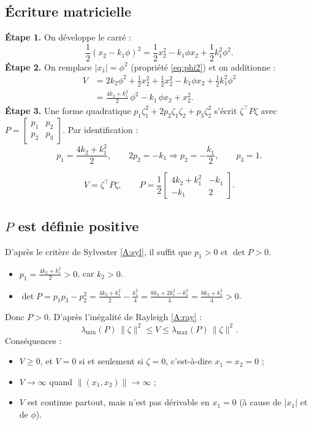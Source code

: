 \documentclass[11pt,a4paper]{article}
\numberwithin{equation}{section}
\theoremstyle{plain}
\theoremstyle{definition}
\theoremstyle{remark}
\begin{document}
\subsection{Écriture matricielle}
\textbf{Étape 1.} On développe le carré :
\begin{equation}
\frac12(x_2-k_1\phi)^2 = \frac12x_2^2 - k_1\phi x_2 + \frac12k_1^2\phi^2 .
\end{equation}
\textbf{Étape 2.} On remplace $|x_1|=\phi^2$ (propriété \eqref{eq:phi2}) et on additionne :
\begin{align}
V &= 2k_2\phi^2 + \frac12x_2^2 + \frac12x_2^2 - k_1\phi x_2 + \frac12k_1^2\phi^2\\
  &= \frac{4k_2+k_1^2}{2}\,\phi^2 - k_1\,\phi x_2 + x_2^2 .
\end{align}
\textbf{Étape 3.} Une forme quadratique $p_1\zeta_1^2 + 2p_2\zeta_1\zeta_2 + p_3\zeta_2^2$ s'écrit $\zeta^\top P\zeta$
avec $P=\begin{bmatrix}p_1&p_2\\p_2&p_3\end{bmatrix}$. Par identification :
\begin{equation}
p_1 = \frac{4k_2+k_1^2}{2},\qquad 2p_2 = -k_1\Rightarrow p_2=-\frac{k_1}{2},\qquad p_3 = 1 .
\end{equation}
\begin{resultat}
\begin{equation}
V = \zeta^\top P\zeta,\qquad P = \frac12\begin{bmatrix}4k_2+k_1^2 & -k_1\\ -k_1 & 2\end{bmatrix}.
\end{equation}
\end{resultat}

\subsection{$P$ est définie positive}
D'après le critère de Sylvester \eqref{A:syl}, il suffit que $p_1>0$ et $\det P>0$.
\begin{itemize}
  \item $p_1 = \frac{4k_2+k_1^2}{2}>0$, car $k_2>0$.
  \item $\det P = p_1p_3-p_2^2 = \frac{4k_2+k_1^2}{2} - \frac{k_1^2}{4} = \frac{8k_2+2k_1^2-k_1^2}{4} = \frac{8k_2+k_1^2}{4}>0$.
\end{itemize}
Donc $P>0$. D'après l'inégalité de Rayleigh \eqref{A:ray} :
\begin{equation}\label{eq:rayleighP}
\lambda_{\min}(P)\,\|\zeta\|^2\le V\le\lambda_{\max}(P)\,\|\zeta\|^2 .
\end{equation}
Conséquences :
\begin{itemize}
  \item $V\ge0$, et $V=0$ si et seulement si $\zeta=0$, c'est-à-dire $x_1=x_2=0$ ;
  \item $V\to\infty$ quand $\|(x_1,x_2)\|\to\infty$ ;
  \item $V$ est continue partout, mais n'est pas dérivable en $x_1=0$ (à cause de $|x_1|$ et de $\phi$).
\end{itemize}
\end{document}
